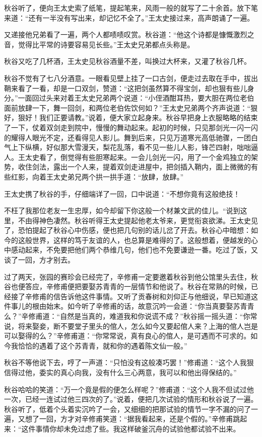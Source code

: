 \documentclass[12pt,UTF8]{ctexbook}
\begin{document}
{{{秋谷听了，便向王太史索了纸笔，提起笔来，风雨一般的就写了二十余首。放下笔来道：“还有一半没有写出来，却记忆不全了。”王太史接过来，高声朗诵了一遍。

又递接他兄弟看了一遍，两个人都啧啧叹赏。秋谷道：“他这个诗都是慷慨激烈之音，觉得比平常的诗要容易见长些。”王太史兄弟都点头称是。

秋谷又吃了几杯酒，王太史见秋谷酒量不差，叫换过大杯来，又灌了秋谷几杯。

秋谷不觉有了七八分酒意。一眼看见壁上挂了一口古剑，便走过去取在手中，拔出鞘来看了一看，却是一口双剑，赞道：“这把剑虽然算不得宝剑，却也狠有些儿身分。”一面回过头来对着王太史兄弟两个说道：“小侄酒酣耳热，要大胆在两位老伯面前放肆一下，舞一回剑，和两位老伯佐饮何如？”王太史兄弟两个齐声说道：“狠好，狠好！我们正要请教。”说着，便大家立起身来。秋谷早把身上衣服略略的结束了一下，仗着双剑走到院中，慢慢的舞动起来。起初的时候，只见那剑光一闪一闪的耀得人眼光不定，还看得见人影儿。舞到后来，只见万道寒光高低驰骤，一团白气上下纵横，好似那大雪漫天，梨花乱落，看不见一些儿人影，锋芒四射，咄咄逼人。王太史看了，倒觉得有些胆寒起来。一会儿剑光一闪，用了一个金鸡独立的架势，收住剑法，露出一个人来，提着双剑走进屋中，把剑插入鞘内，面上微微的有些红影，向着王太史弟兄两个拱一拱手道：“放肆，放肆。”

王太史携了秋谷的手，仔细端详了一回，口中说道：“不想你竟有这般绝技！

不枉了我那位老友一生忠厚，如今却留下你这般一个材兼文武的佳儿。“说到这里，不由得神色凄然。秋谷听得王太史提起他老太爷来，更觉衔哀欲涕。王太史见了，恐怕提起了秋谷心中伤感，便也把几句别的话儿岔了开去。秋谷心中暗想：如今的这般世界，这样的笃于友谊的人，也总算是难得的了。这般想着，便越发的心中感动起来，不免要把他们两个恭维几句，他们也不免要谦逊一番。吃过了饭，又谈了一回，方才别去。

过了两天，张园的赛珍会已经完了，辛修甫一定要邀着秋谷到他公馆里头去住，秋谷也便答应，辛修甫便把要娶苏青青的一层情节和他说了。秋谷在常熟的时候，已经接了辛修甫的信告诉他这件事情。又听了贡春树和刘仰正与他细说，早已知道这件事儿的根由始末。如今听了辛修甫的话，故意沉吟一会道：“你当真要娶苏青青么？”辛修甫道：“自然是当真的，难道我和你说谎不成？”秋谷摇一摇头道：“你常说，将来娶妾，断不要堂子里头的倌人，怎么如今又要起倌人来？上海的倌人岂是可以娶得的么？”辛修甫道：“你常常说，真有良心的倌人，是可遇而不可求的。如今我恰恰的遇着了这个苏青青，就和你的遇着陈文仙一般。”

秋谷不等他说下去，哼了一声道：“只怕没有这般凑巧罢！”修甫道：“这个人我狠信得过他，委实的真心向我，没有什么三心两意，我可以和他出得保结的。”

秋谷哈哈的笑道：“万一个竟是假的便怎么样呢？”修甫道：“这个人我不但试过他一次，已经一连试过他三四次的了。”说着，便把几次试验的情形和秋谷说了一遍。秋谷听了，低着个头着实沉吟了一会，又细细的把那试验的情节一字不漏的问了一遍，又想了一回，方才对辛修甫笑道：“据我看起来，还是个假的。”辛修甫跳起来：“这件事情你却未免过虑了些。我这样破釜沉舟的试验他都试验不出来。

}}}
\end{document}
